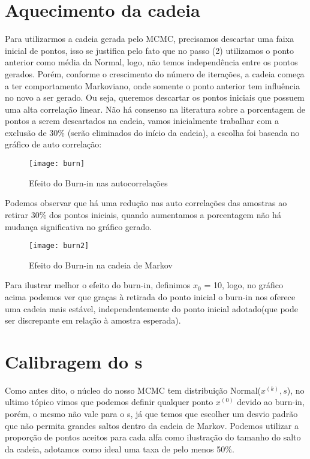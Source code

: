 \documentclass{article}
\begin{document}
\section{Aquecimento da cadeia}
Para utilizarmos a cadeia gerada pelo MCMC, precisamos descartar uma faixa inicial de pontos, isso se justifica pelo fato que no passo (2) utilizamos o ponto anterior como média da Normal, logo, não temos independência entre os pontos gerados. Porém, conforme o crescimento do número de iterações, a cadeia começa a ter comportamento Markoviano, onde somente o ponto anterior tem influência no novo a ser gerado. Ou seja, queremos descartar os pontos iniciais que possuem uma alta correlação linear. Não há consenso na literatura sobre a porcentagem de pontos a serem descartados na cadeia, vamos inicialmente trabalhar com a exclusão de 30\% (serão eliminados do início da cadeia), a escolha foi baseada no gráfico de auto correlação:\\

\begin{figure}[h]
\begin{center}
	\texttt{[image: burn]}
	\caption{Efeito do Burn-in nas autocorrelações}
\end{center}
\end{figure}
Podemos observar que há uma redução nas auto correlações das amostras ao retirar 30\% dos pontos iniciais, quando aumentamos a porcentagem não há mudança significativa no gráfico gerado.\\

\begin{figure}[H]
	\begin{center}
		\texttt{[image: burn2]}
		\caption{Efeito do Burn-in na cadeia de Markov}
	\end{center}
\end{figure}

Para ilustrar melhor o efeito do burn-in, definimos $x_0$ = 10, logo, no gráfico acima podemos ver que graças à retirada do ponto inicial o burn-in nos oferece uma cadeia mais estável, independentemente do ponto inicial adotado(que pode ser discrepante em relação à amostra esperada).

\section{Calibragem do s}
Como antes dito, o núcleo do nosso MCMC tem distribuição Normal($x^{(k)},s$), no ultimo tópico vimos que podemos definir qualquer ponto $x^{(0)}$ devido ao burn-in, porém, o mesmo não vale para o s, já que temos que escolher um desvio padrão que não permita grandes saltos dentro da cadeia de Markov. Podemos utilizar a proporção de pontos aceitos para cada alfa como ilustração do tamanho do salto da cadeia, adotamos como ideal uma taxa de pelo menos 50\%.
\end{document}
